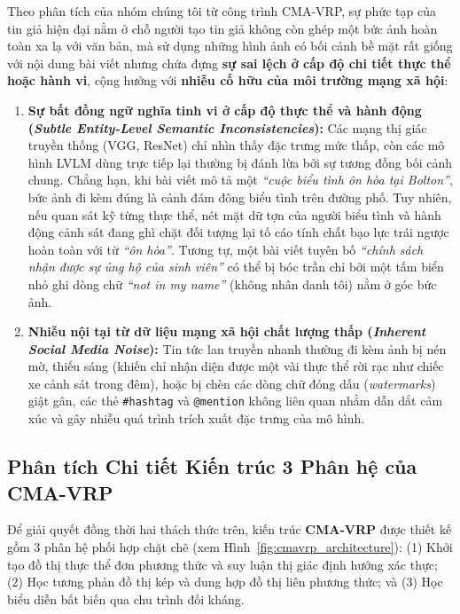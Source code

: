 \documentclass[conference,10pt]{IEEEtran}
\begin{document}
Theo phân tích của nhóm chúng tôi từ công trình CMA-VRP, sự phức tạp của tin giả hiện đại nằm ở chỗ người tạo tin giả không còn ghép một bức ảnh hoàn toàn xa lạ với văn bản, mà sử dụng những hình ảnh có bối cảnh bề mặt rất giống với nội dung bài viết nhưng chứa đựng \textbf{sự sai lệch ở cấp độ chi tiết thực thể hoặc hành vi}, cộng hưởng với \textbf{nhiễu cố hữu của môi trường mạng xã hội}:
\begin{enumerate}
    \item \textbf{Sự bất đồng ngữ nghĩa tinh vi ở cấp độ thực thể và hành động (\textit{Subtle Entity-Level Semantic Inconsistencies}):}
    Các mạng thị giác truyền thống (VGG, ResNet) chỉ nhìn thấy đặc trưng mức thấp, còn các mô hình LVLM dùng trực tiếp lại thường bị đánh lừa bởi sự tương đồng bối cảnh chung. Chẳng hạn, khi bài viết mô tả một \textit{``cuộc biểu tình ôn hòa tại Bolton''}, bức ảnh đi kèm đúng là cảnh đám đông biểu tình trên đường phố. Tuy nhiên, nếu quan sát kỹ từng thực thể, nét mặt dữ tợn của người biểu tình và hành động cảnh sát đang ghì chặt đối tượng lại tố cáo tính chất bạo lực trái ngược hoàn toàn với từ \textit{``ôn hòa''}. Tương tự, một bài viết tuyên bố \textit{``chính sách nhận được sự ủng hộ của sinh viên''} có thể bị bóc trần chỉ bởi một tấm biển nhỏ ghi dòng chữ \textit{``not in my name''} (không nhân danh tôi) nằm ở góc bức ảnh.
    \item \textbf{Nhiễu nội tại từ dữ liệu mạng xã hội chất lượng thấp (\textit{Inherent Social Media Noise}):}
    Tin tức lan truyền nhanh thường đi kèm ảnh bị nén mờ, thiếu sáng (khiến chỉ nhận diện được một vài thực thể rời rạc như chiếc xe cảnh sát trong đêm), hoặc bị chèn các dòng chữ đóng dấu (\textit{watermarks}) giật gân, các thẻ \texttt{\#hashtag} và \texttt{@mention} không liên quan nhằm dẫn dắt cảm xúc và gây nhiễu quá trình trích xuất đặc trưng của mô hình.
\end{enumerate}

\subsection{Phân tích Chi tiết Kiến trúc 3 Phân hệ của CMA-VRP}

Để giải quyết đồng thời hai thách thức trên, kiến trúc \textbf{CMA-VRP} được thiết kế gồm 3 phân hệ phối hợp chặt chẽ (xem Hình~\ref{fig:cmavrp_architecture}): (1) Khởi tạo đồ thị thực thể đơn phương thức và suy luận thị giác định hướng xác thực; (2) Học tương phản đồ thị kép và dung hợp đồ thị liên phương thức; và (3) Học biểu diễn bất biến qua chu trình đối kháng.
\end{document}

